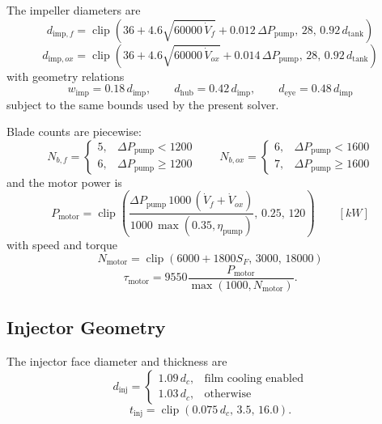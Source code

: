 \documentclass[11pt]{article}
\newcommand{\clip}{\operatorname{clip}}
\begin{document}
The impeller diameters are
\begin{equation}
d_{\text{imp},f}
=
\clip\!\left(
36+4.6\sqrt{60000\,\dot{V}_f}+0.012\,\Delta P_{\text{pump}},
\,
28,\,
0.92\,d_{\text{tank}}
\right)
\label{eq:fuel-impeller-dia}
\end{equation}
\begin{equation}
d_{\text{imp},ox}
=
\clip\!\left(
36+4.6\sqrt{60000\,\dot{V}_{ox}}+0.014\,\Delta P_{\text{pump}},
\,
28,\,
0.92\,d_{\text{tank}}
\right)
\label{eq:ox-impeller-dia}
\end{equation}
with geometry relations
\begin{equation}
w_{\text{imp}}=0.18\,d_{\text{imp}},
\qquad
d_{\text{hub}}=0.42\,d_{\text{imp}},
\qquad
d_{\text{eye}}=0.48\,d_{\text{imp}}
\label{eq:impeller-ratios}
\end{equation}
subject to the same bounds used by the present solver.

Blade counts are piecewise:
\begin{equation}
N_{b,f}=
\begin{cases}
5, & \Delta P_{\text{pump}}<1200\\
6, & \Delta P_{\text{pump}}\ge 1200
\end{cases}
\qquad
N_{b,ox}=
\begin{cases}
6, & \Delta P_{\text{pump}}<1600\\
7, & \Delta P_{\text{pump}}\ge 1600
\end{cases}
\label{eq:blade-count}
\end{equation}
and the motor power is
\begin{equation}
P_{\text{motor}}
=
\clip\!\left(
\frac{\Delta P_{\text{pump}}\,1000\,(\dot{V}_f+\dot{V}_{ox})}{1000\,\max(0.35,\eta_{\text{pump}})},
\,
0.25,\,
120
\right)
\qquad [\si{kW}]
\label{eq:motor-power}
\end{equation}
with speed and torque
\begin{equation}
N_{\text{motor}}=\clip(6000+1800S_F,\,3000,\,18000)
\label{eq:motor-speed}
\end{equation}
\begin{equation}
\tau_{\text{motor}}=9550\frac{P_{\text{motor}}}{\max(1000,N_{\text{motor}})}.
\label{eq:motor-torque}
\end{equation}

\subsection{Injector Geometry}
The injector face diameter and thickness are
\begin{equation}
d_{\text{inj}}=
\begin{cases}
1.09\,d_c, & \text{film cooling enabled}\\
1.03\,d_c, & \text{otherwise}
\end{cases}
\label{eq:injector-face-dia}
\end{equation}
\begin{equation}
t_{\text{inj}}=\clip(0.075\,d_c,\,3.5,\,16.0).
\label{eq:injector-face-thickness}
\end{equation}
\end{document}
